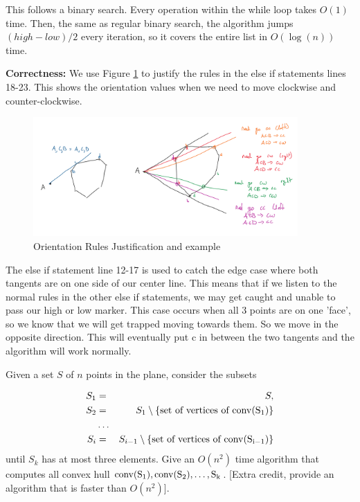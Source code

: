 \documentclass[11pt]{article}
\newcommand{\conv}[1]{\rm{conv}(#1)}
\begin{document}
This follows a binary search. Every operation within the while loop takes $O(1)$ time. Then, the same as regular binary search,
the algorithm jumps $(high-low)/2$ every iteration, so it covers the entire list in $O(\log (n))$ time. 

\textbf{Correctness:} 
We use Figure \ref{fig:orientation} to justify the rules in the else if statements lines 18-23.
This shows the orientation values when we need to move clockwise and counter-clockwise.
\begin{figure}[h]
    \centering
    \includegraphics[width=0.9\textwidth]{prob_3_correctness.png}
    \caption{Orientation Rules Justification and example}
    \label{fig:orientation}
\end{figure}

The else if statement line 12-17 is used to catch the edge case where both tangents are on one side of our center line.
This means that if we listen to the normal rules in the other else if statements, we may get caught and unable to pass our high or low marker. 
This case occurs when all 3 points are on one 'face', so we know that we will get trapped moving towards them.
So we move in the opposite direction. This will eventually put c in between the two tangents and the algorithm will work normally.



Given a set $S$ of $n$ points in the plane, consider the subsets

\begin{eqnarray*}
	S_1 &=& S, \\
	S_2 &=& S_1 \setminus \{ \text{set of vertices of } \conv{S_1} \} \\
		&\ldots& \\
	S_i &=& S_{i-1} \setminus \{ \text{set of vertices of } \conv{S_{i-1}} \}
\end{eqnarray*}
%
until $S_k$ has at most three elements.  Give an $O(n^2)$ time algorithm that
computes all convex hull $\conv{S_1}, \conv{S_2}, \ldots, S_k$.  [Extra credit,
provide an algorithm that is faster than $O(n^2)$].
\end{document}
